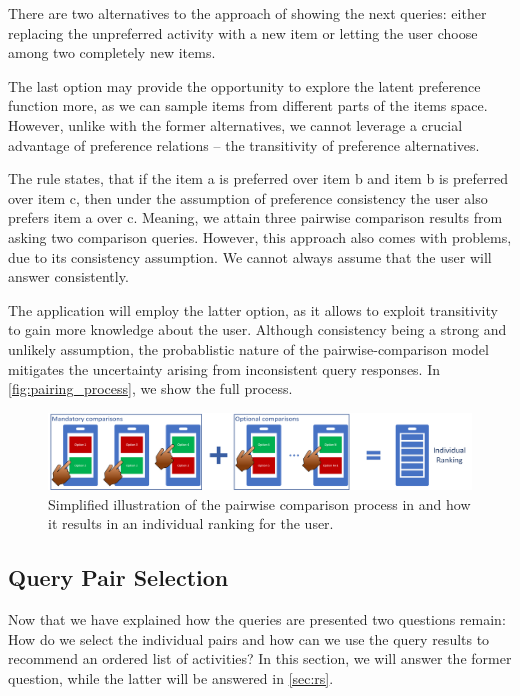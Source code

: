 \documentclass[11pt,a4paper,oneside]{article}
\begin{document}
There are two alternatives to the approach of showing the next queries: either replacing the unpreferred activity with a new item or letting the user choose among two completely new items. 

The last option may provide the opportunity to explore the latent preference function more, as we can sample items from different parts of the items space. However, unlike with the former alternatives, we cannot leverage a crucial advantage of preference relations -- the transitivity of preference alternatives.

The rule states, that if the item a is preferred over item b and item b is preferred over item c, then under the assumption of preference consistency the user also prefers item a over c. Meaning, we attain three pairwise comparison results from asking two comparison queries. However, this approach also comes with problems, due to its consistency assumption. We cannot always assume that the user will answer consistently.

The application will employ the latter option, as it allows to exploit transitivity to gain more knowledge about the user. Although consistency being a strong and unlikely assumption, the probablistic nature of the pairwise-comparison model mitigates the uncertainty arising from inconsistent query responses.
In \autoref{fig:pairing_process}, we show the full process.
\begin{figure}[H]
    \centering
    \includegraphics[width=\textwidth]{paper/imgs/pairwise_comparisons.png}
    \caption{Simplified illustration of the pairwise comparison process in and how it results in an individual ranking for the user.}
    \label{fig:pairing_process}
\end{figure}

\subsection{Query Pair Selection}
\label{sec:pair}
Now that we have explained how the queries are presented two questions remain: How do we select the individual pairs and how can we use the query results to recommend an ordered list of activities? In this section, we will answer the former question, while the latter will be answered in \autoref{sec:rs}. 
\end{document}
